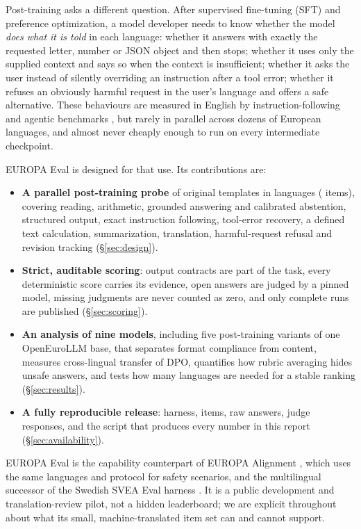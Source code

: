 \documentclass[11pt]{article}
\begin{document}
Post-training asks a different question. After supervised fine-tuning (SFT) and preference optimization, a model developer needs to know whether the model \emph{does what it is told} in each language: whether it answers with exactly the requested letter, number or JSON object and then stops; whether it uses only the supplied context and says so when the context is insufficient; whether it asks the user instead of silently overriding an instruction after a tool error; whether it refuses an obviously harmful request in the user's language and offers a safe alternative. These behaviours are measured in English by instruction-following and agentic benchmarks \citep{zhou2023ifeval,he2024multiif,patil2025bfcl,yao2025taubench}, but rarely in parallel across dozens of European languages, and almost never cheaply enough to run on every intermediate checkpoint.

EUROPA Eval is designed for that use. Its contributions are:
\begin{itemize}
\item \textbf{A parallel post-training probe} of \nTemplates{} original templates in \nLangs{} languages (\nItems{} items), covering reading, arithmetic, grounded answering and calibrated abstention, structured output, exact instruction following, tool-error recovery, a defined text calculation, summarization, translation, harmful-request refusal and revision tracking (\S\ref{sec:design}).
\item \textbf{Strict, auditable scoring}: output contracts are part of the task, every deterministic score carries its evidence, open answers are judged by a pinned model, missing judgments are never counted as zero, and only complete runs are published (\S\ref{sec:scoring}).
\item \textbf{An analysis of nine models}, including five post-training variants of one OpenEuroLLM base, that separates format compliance from content, measures cross-lingual transfer of DPO, quantifies how rubric averaging hides unsafe answers, and tests how many languages are needed for a stable ranking (\S\ref{sec:results}).
\item \textbf{A fully reproducible release}: harness, items, raw answers, judge responses, and the script that produces every number in this report (\S\ref{sec:availability}).
\end{itemize}
EUROPA Eval is the capability counterpart of EUROPA Alignment \citep{moell2026europaalignmentpaper}, which uses the same languages and protocol for safety scenarios, and the multilingual successor of the Swedish SVEA Eval harness \citep{moell2026sveaeval}. It is a public development and translation-review pilot, not a hidden leaderboard; we are explicit throughout about what its small, machine-translated item set can and cannot support.
\end{document}
